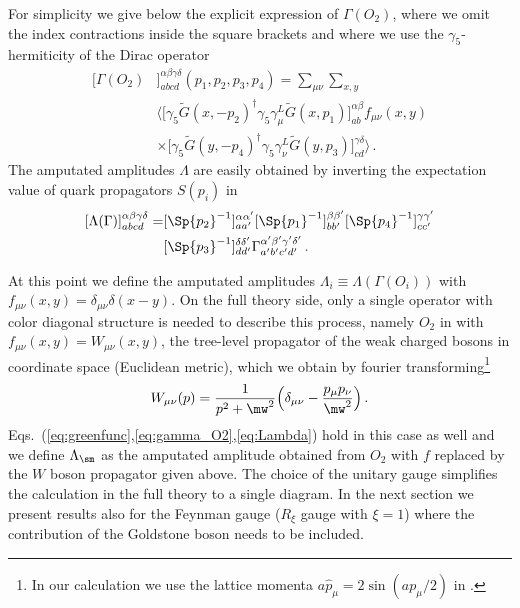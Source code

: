 \documentclass[aps,prd,twocolumn,nofootinbib,showpacs,superscriptaddress]{revtex4-1}
\begin{document}
For simplicity we give below the explicit expression of $\Gamma(O_2)$, where
we omit the index contractions inside the square brackets and where
we use the $\gamma_5$-hermiticity of the Dirac operator
\begin{equation}
\begin{split}
[\Gamma(O_2) & ]^{\alpha \beta \gamma \delta}_{a b c d} (p_1,p_2,p_3,p_4) = \sum_{\mu \nu} \sum_{x,y} \\
& \langle \big[ \gamma_5 \tilde G(x,-p_2)^\dagger \gamma_5 \gamma_\mu^L \tilde G(x,p_1) \big]^{\alpha \beta}_{a b} f_{\mu \nu}(x,y)  \\
& \times \big[ \gamma_5 \tilde G(y,-p_4)^\dagger \gamma_5 \gamma_\nu^L \tilde G(y,p_3) \big]^{\gamma \delta}_{c d} \rangle \,.
\end{split}
\label{eq:gamma_O2}
\end{equation}
The amputated amplitudes $\Lambda$ are easily obtained by inverting
the expectation value of quark propagators $S(p_i)$ in 
\begin{equation}
\begin{split}
[\Lambda(\Gamma) ]^{\alpha \beta \gamma \delta}_{a b c d} = & 
  [\Sp{p_2}^{-1}]^{\alpha \alpha^\prime}_{a a^\prime}
  [\Sp{p_1}^{-1}]^{\beta \beta^\prime}_{b b^\prime}
  [\Sp{p_4}^{-1}]^{\gamma \gamma^\prime}_{c c^\prime} \\ &
  [\Sp{p_3}^{-1}]^{\delta \delta^\prime}_{d d^\prime}
\Gamma^{\alpha^\prime \beta^\prime \gamma^\prime \delta^\prime}_{a^\prime b^\prime c^\prime d^\prime} \,.
\end{split}
\label{eq:Lambda}
\end{equation}

At this point we define the amputated amplitudes $\Lambda_i \equiv \Lambda(\Gamma(O_i))$ 
with $f_{\mu \nu} (x,y)=\delta_{\mu \nu} \delta(x-y)$.
On the full theory side, only a single operator with color diagonal structure 
is needed to describe this process, namely $O_2$ in  
with $f_{\mu \nu}(x,y) = W_{\mu \nu}(x,y)$, the tree-level propagator 
of the weak charged bosons in coordinate
space (Euclidean metric), which we obtain by fourier 
transforming\footnote{
In our calculation we use the lattice momenta $ a \hat p_\mu = 2 \sin(a p_\mu/2)$ in 
.
}
\begin{equation}
W_{\mu \nu}(p) = \frac{1}{p^2 + \mw^2} \Big( \delta_{\mu\nu} - \frac{p_\mu p_\nu}{\mw^2} \Big) \,. 
\label{eq:wprop}
\end{equation}
Eqs.~(\ref{eq:greenfunc},\ref{eq:gamma_O2},\ref{eq:Lambda}) hold in this case as well
and we define $\Lambda_\sm$ as the amputated amplitude obtained from $O_2$ with $f$ replaced
by the $W$ boson propagator given above.
The choice of the unitary gauge simplifies the calculation in the full theory to a
single diagram. In the next section we present results also for the 
Feynman gauge ($R_\xi$ gauge with $\xi=1$) where the contribution of the Goldstone
boson needs to be included. \\
\end{document}
